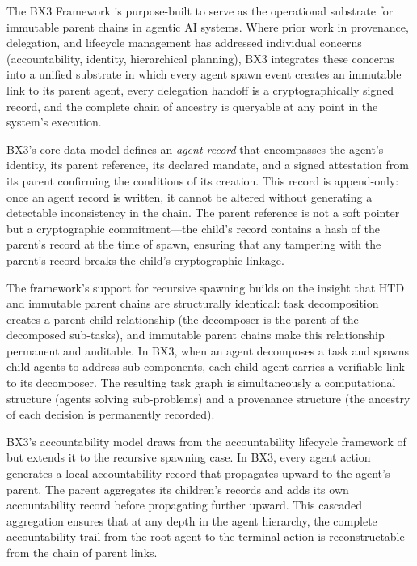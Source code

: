 
The BX3 Framework is purpose-built to serve as the operational substrate for immutable parent chains in agentic AI systems. Where prior work in provenance, delegation, and lifecycle management has addressed individual concerns (accountability, identity, hierarchical planning), BX3 integrates these concerns into a unified substrate in which every agent spawn event creates an immutable link to its parent agent, every delegation handoff is a cryptographically signed record, and the complete chain of ancestry is queryable at any point in the system's execution.

BX3's core data model defines an \emph{agent record} that encompasses the agent's identity, its parent reference, its declared mandate, and a signed attestation from its parent confirming the conditions of its creation. This record is append-only: once an agent record is written, it cannot be altered without generating a detectable inconsistency in the chain. The parent reference is not a soft pointer but a cryptographic commitment---the child's record contains a hash of the parent's record at the time of spawn, ensuring that any tampering with the parent's record breaks the child's cryptographic linkage.

The framework's support for recursive spawning builds on the insight that HTD and immutable parent chains are structurally identical: task decomposition creates a parent-child relationship (the decomposer is the parent of the decomposed sub-tasks), and immutable parent chains make this relationship permanent and auditable. In BX3, when an agent decomposes a task and spawns child agents to address sub-components, each child agent carries a verifiable link to its decomposer. The resulting task graph is simultaneously a computational structure (agents solving sub-problems) and a provenance structure (the ancestry of each decision is permanently recorded).

BX3's accountability model draws from the accountability lifecycle framework of \cite{ferrandin2022accountability} but extends it to the recursive spawning case. In BX3, every agent action generates a local accountability record that propagates upward to the agent's parent. The parent aggregates its children's records and adds its own accountability record before propagating further upward. This cascaded aggregation ensures that at any depth in the agent hierarchy, the complete accountability trail from the root agent to the terminal action is reconstructable from the chain of parent links.

